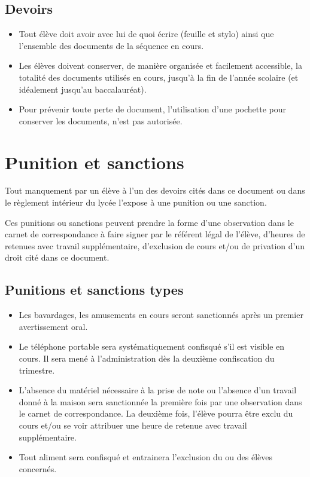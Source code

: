 \documentclass[11pt]{article}
\begin{document}
\subsection{Devoirs}
\begin{itemize}
    \item Tout élève doit avoir avec lui de quoi écrire (feuille et stylo) ainsi que l'ensemble des documents de la séquence en cours.
    \item Les élèves doivent conserver, de manière organisée et facilement accessible, la totalité des documents utilisés en cours, jusqu'à la fin de l'année scolaire (et idéalement jusqu'au baccalauréat).
    \item Pour prévenir toute perte de document, l'utilisation d'une pochette pour conserver les documents, n'est pas autorisée.

\end{itemize}

\section{Punition et sanctions}
Tout manquement par un élève à l'un des devoirs cités dans ce document ou dans le règlement intérieur du lycée l'expose à une punition ou une sanction.

Ces punitions ou sanctions peuvent prendre la forme d'une observation dans le carnet de correspondance à faire signer par le référent légal de l'élève, d'heures de retenues avec travail supplémentaire, d'exclusion de cours et/ou de privation d'un droit cité dans ce document.

\subsection{Punitions et sanctions types}
\begin{itemize}
    \item Les bavardages, les amusements en cours seront sanctionnés après un premier avertissement oral.
    \item Le téléphone portable sera systématiquement confisqué s'il est visible en cours. Il sera mené à l'administration dès la deuxième confiscation du trimestre.
    \item L'absence du matériel nécessaire à la prise de note ou l'absence d'un travail donné à la maison sera sanctionnée la première fois par une observation dans le carnet de correspondance. La deuxième fois, l'élève pourra être exclu du cours et/ou se voir attribuer une heure de retenue avec travail supplémentaire.
    \item Tout aliment sera confisqué et entrainera l'exclusion du ou des élèves concernés.
\end{itemize}
\end{document}
